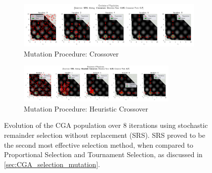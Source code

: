 \documentclass[10pt]{article}
\begin{document}

\begin{figure}[H]
    \centering
    \begin{subfigure}{0.85\textwidth}
        \centering
        \includegraphics[width=\textwidth]{../figures/KBF/10_iters/SRS/Crossover/0.05_0.7_Population.png}
        \caption{Mutation Procedure: Crossover}
        \label{fig:CGA_flowchart_SRS_crossover}
    \end{subfigure}
    \begin{subfigure}{\textwidth}
        \centering
        \includegraphics[width=0.85\textwidth]{../figures/KBF/10_iters/SRS/Heuristic Crossover/0.05_0.7_Population.png}
        \caption{Mutation Procedure: Heuristic Crossover}
        \label{fig:CGA_flowchart_SRS_Heuristic Crossover}
    \end{subfigure}
    \captionsetup{justification=centering}
    \caption{Evolution of the CGA population over 8 iterations using stochastic remainder selection without replacement (SRS). SRS proved to be the second most effective selection method, when compared to Proportional Selection and Tournament Selection, as discussed in \ref{sec:CGA_selection_mutation}.}
    \label{fig:CGA_flowchart_SRS}
\end{figure}
\end{document}
